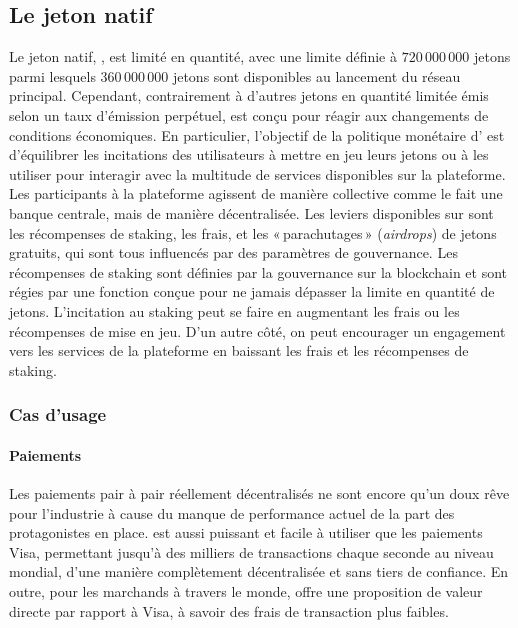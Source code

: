 \documentclass[runningheads,francais,a4paper]{llncs}
\begin{document}
\subsection{Le jeton natif \AVATokenName{}}
Le jeton natif, \AVATokenName{}, est limité en quantité, avec une limite définie à $720\,000\,000$ jetons parmi lesquels
$360\,000\,000$ jetons sont disponibles au lancement du réseau principal. Cependant, contrairement à d'autres jetons en
quantité limitée émis selon un taux d'émission perpétuel, \AVATokenName{} est conçu pour réagir aux changements de
conditions économiques. En particulier, l'objectif de la politique monétaire d'\AVATokenName{} est d'équilibrer les
incitations des utilisateurs à mettre en jeu leurs jetons ou à les utiliser pour interagir avec la multitude de
services disponibles sur la plateforme. Les participants à la plateforme agissent de manière collective comme le fait une banque
centrale, mais de manière décentralisée. Les leviers disponibles sur \AVAPlatformName{} sont les récompenses de staking, les frais, et les
«\,parachutages\,» (\emph{airdrops}) de jetons gratuits, qui sont tous influencés par des paramètres de gouvernance. Les
récompenses de staking sont définies par la gouvernance sur la blockchain et sont régies par une fonction conçue pour
ne jamais dépasser la limite en quantité de jetons. L'incitation au staking peut se faire en augmentant les frais ou les
récompenses de mise en jeu. D'un autre côté, on peut encourager un engagement vers les services de la plateforme
\AVAPlatformName{} en baissant les frais et les récompenses de staking.

\subsubsection{Cas d'usage}
\paragraph{Paiements}
Les paiements pair à pair réellement décentralisés ne sont encore qu'un doux rêve pour l'industrie à cause du manque de
performance actuel de la part des protagonistes en place. \AVATokenName{} est aussi puissant et facile à utiliser que
les paiements Visa, permettant jusqu'à des milliers de transactions chaque seconde au niveau mondial, d'une manière
complètement décentralisée et sans tiers de confiance. En outre, pour les marchands à travers le monde, \AVATokenName{}
offre une proposition de valeur directe par rapport à Visa, à savoir des frais de transaction plus faibles.
\end{document}
